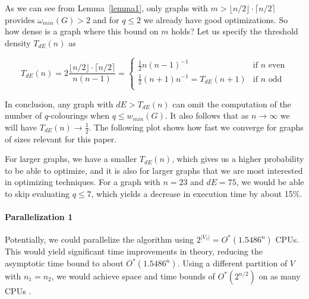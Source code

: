 \documentclass[a4paper]{article}
\begin{document}
As we can see from Lemma~\ref{lemma1}, only graphs with $m > \lfloor n / 2 \rfloor \cdot \lceil n / 2 \rceil$ provides $\omega_{min}(G) > 2$ and for $q \leq 2$ we already have good optimizations. So how dense is a graph where this bound on $m$ holds? Let us specify the threshold density $T_{dE}(n)$ as

\[
T_{dE}(n) = 2\frac{\lfloor n / 2 \rfloor \cdot \lceil n / 2 \rceil}{n(n-1)} =
\begin{cases}
	  \frac{1}{2}n(n-1)^{-1} & \text{if } n \text{ even}\\
	  \frac{1}{2}(n+1)n^{-1} = T_{dE}(n+1) & \text{if } n \text{ odd}\\
\end{cases}
\]

In conclusion, any graph with $dE > T_{dE}(n)$ can omit the computation of the number of $q$-colourings when $q \leq w_{min}(G)$. It also follows that as $n \rightarrow \infty$ we will have $T_{dE}(n) \rightarrow \frac{1}{2}$. The following plot shows how fast we converge for graphs of sizes relevant for this paper.

\begin{center}
\end{center}
For larger graphs, we have a smaller $T_{dE}(n)$, which gives us a higher probability to be able to optimize, and it is also for larger graphs that we are most interested in optimizing techniques. For a graph with $n=23$ and $dE = 75$, we would be able to skip evaluating $q\leq7$, which yields a decrease in execution time by about 15\%\footnotemark.


\paragraph{Parallelization 1} Potentially, we could parallelize the algorithm using $2^{|V_1|} = O^*(1.5486^n)$ CPUs. This would yield significant time improvements in theory, reducing the asymptotic time bound to about $O^*(1.5486^n)$. Using a different partition of $V$ with $n_1 = n_2$, we would achieve space and time bounds of $O^*(2^{n/2})$ on as many CPUs \cite{cov_pack}.
\end{document}
